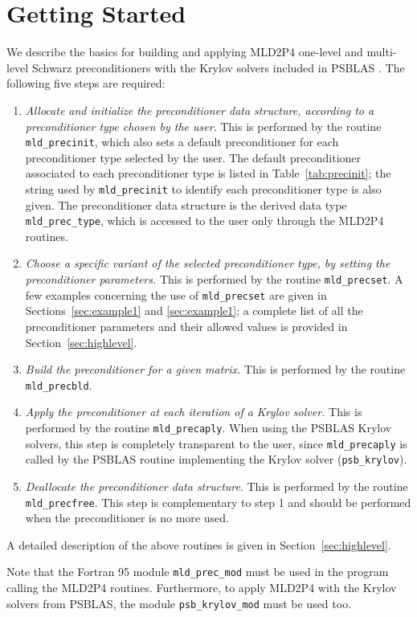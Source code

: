 \section{Getting Started\label{sec:started}}

We describe the basics for building and applying MLD2P4 one-level and multi-level
Schwarz preconditioners with the Krylov solvers included in PSBLAS \cite{}.
The following five steps are required:
\begin{enumerate}
\item \emph{Allocate and initialize the preconditioner data structure, according to
	a preconditioner type chosen by the user}. This is performed by the routine
	\verb|mld_precinit|, which also sets a default preconditioner for each preconditioner
	type selected by the user. The default preconditioner associated to each preconditioner
	type is listed in Table~\ref{tab:precinit}; the string used by \verb|mld_precinit|
	to identify each preconditioner type is also given. The preconditioner data structure is
	the derived data type \verb|mld_prec_type|, which is accessed to the user only
	through the MLD2P4 routines.
\item \emph{Choose a specific variant of the selected preconditioner type, by setting
  the preconditioner parameters.} This is performed by the routine \verb|mld_precset|.
  A few examples concerning the use of \verb|mld_precset| are given in 
  Sections~\ref{sec:example1} and \ref{sec:example1}; a complete list of all the
  preconditioner parameters and their allowed values is provided in 
  Section~\ref{sec:highlevel}. 
\item \emph{Build the preconditioner for a given matrix.} This is performed by
  the routine \verb|mld_precbld|.
\item \emph{Apply the preconditioner at each iteration of a Krylov solver.}
  This is performed by the routine \verb|mld_precaply|. When using the PSBLAS Krylov solvers,
  this step is completely transparent to the user, since \verb|mld_precaply| is called
  by the PSBLAS routine implementing the Krylov solver (\verb|psb_krylov|).
\item \emph{Deallocate the preconditioner data structure}. This is performed by
  the routine \verb|mld_precfree|. This step is complementary to step 1 and should
  be performed when the preconditioner is no more used.
\end{enumerate}
A detailed description of the above routines is given in Section~\ref{sec:highlevel}.

Note that the Fortran 95 module \verb|mld_prec_mod| must be used in the program
calling the MLD2P4 routines. Furthermore, to apply MLD2P4 with the Krylov solvers
from PSBLAS, the module \verb|psb_krylov_mod| must be used too.

